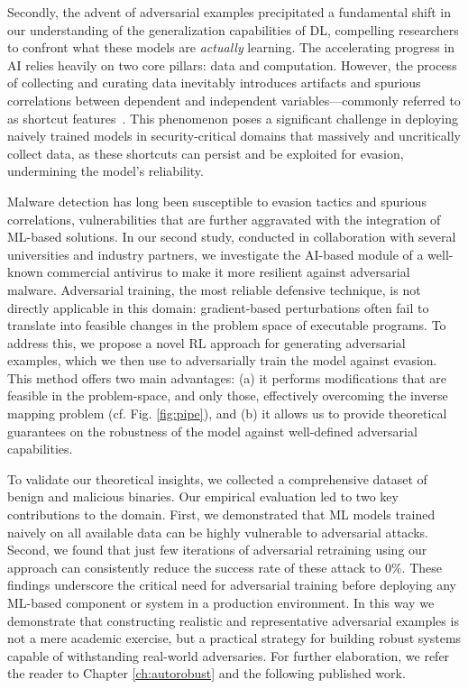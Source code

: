 Secondly, the advent of adversarial examples precipitated a fundamental shift in our understanding of the generalization capabilities of \gls{DL}, compelling researchers to confront what these models are \textit{actually} learning.
The accelerating progress in \gls{AI} relies heavily on two core pillars: data and computation.
However, the process of collecting and curating data inevitably introduces artifacts and spurious correlations between dependent and independent variables—commonly referred to as shortcut features~\cite{geirhos2020shortcut}.
This phenomenon poses a significant challenge in deploying naively trained models in security-critical domains that massively and uncritically collect data, as these shortcuts can persist and be exploited for evasion, undermining the model's reliability. 

Malware detection has long been susceptible to evasion tactics and spurious correlations, vulnerabilities that are further aggravated with the integration of ML-based solutions.
In our second study, conducted in collaboration with several universities and industry partners, we investigate the \gls{AI}-based module of a well-known commercial antivirus to make it more resilient against adversarial malware.
Adversarial training, the most reliable defensive technique, is not directly applicable in this domain: gradient-based perturbations often fail to translate into feasible changes in the problem space of executable programs.
To address this, we propose a novel \gls{RL} approach for generating adversarial examples, which we then use to adversarially train the model against evasion.
This method offers two main advantages: (a) it performs modifications that are feasible in the problem-space, and only those, effectively overcoming the inverse mapping problem (cf. Fig. \ref{fig:pipe}), and (b) it allows us to provide theoretical guarantees on the robustness of the model against well-defined adversarial capabilities.

To validate our theoretical insights, we collected a comprehensive dataset of benign and malicious binaries.
Our empirical evaluation led to two key contributions to the domain.
First, we demonstrated that \gls{ML} models trained naively on all available data can be highly vulnerable to adversarial attacks.
Second, we found that just few iterations of adversarial retraining using our approach can consistently reduce the success rate of these attack to 0\%.
These findings underscore the critical need for adversarial training before deploying any ML-based component or system in a production environment. 
In this way we demonstrate that constructing realistic and representative adversarial examples is not a mere academic exercise, but a practical strategy for building robust systems capable of withstanding real-world adversaries.
For further elaboration, we refer the reader to Chapter \ref{ch:autorobust} and the following published work.

